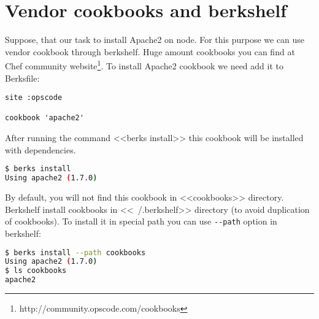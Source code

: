 \section{Vendor cookbooks and berkshelf}

Suppose, that our task to install Apache2 on node. For this purpose we can use vendor cookbook through berkshelf. Huge amount cookbooks you can find at Chef community website\footnote{http://community.opscode.com/cookbooks}. To install Apache2 cookbook we need add it to Berksfile:

\begin{lstlisting}[label=lst:my-cloud-berkshelf1,title=my-cloud/Berksfile]
site :opscode

cookbook 'apache2'
\end{lstlisting}

After running the command <<berks install>> this cookbook will be installed with dependencies.

\begin{lstlisting}[language=Bash,label=lst:my-cloud-berkshelf2,title=my-cloud/Berksfile]
$ berks install
Using apache2 (1.7.0)
\end{lstlisting}

By default, you will not find this cookbook in <<cookbooks>> directory. Berkshelf install cookbooks in <<~/.berkshelf>> directory (to avoid duplication of cookbooks). To install it in special path you can use \texttt{-\--path} option in berkshelf:

\begin{lstlisting}[language=Bash,label=lst:my-cloud-berkshelf3,title=my-cloud/Berksfile]
$ berks install --path cookbooks
Using apache2 (1.7.0)
$ ls cookbooks
apache2
\end{lstlisting}

